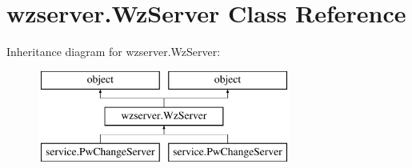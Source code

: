 \hypertarget{classwzserver_1_1WzServer}{\section{wzserver.\-Wz\-Server Class Reference}
\label{classwzserver_1_1WzServer}
}
Inheritance diagram for wzserver.\-Wz\-Server\-:\begin{figure}[H]
\begin{center}
\leavevmode
\includegraphics[height=3.000000cm]{classwzserver_1_1WzServer}
\end{center}
\end{figure}
